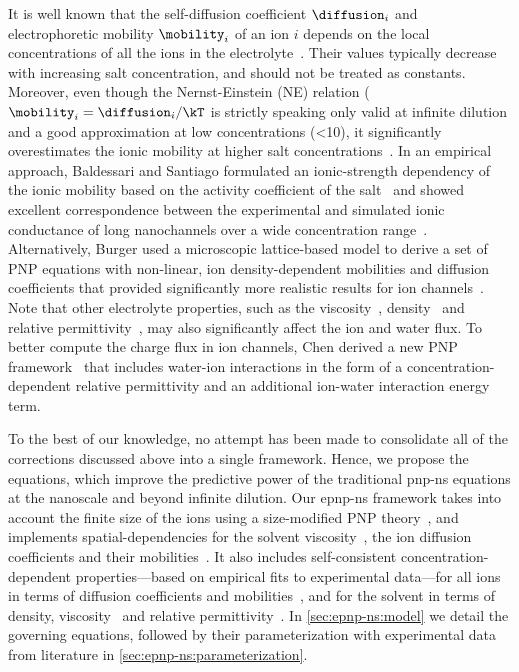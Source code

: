 It is well known that the self-diffusion coefficient $\diffusion_{i}$ and electrophoretic mobility
$\mobility_{i}$ of an ion $i$ depends on the local concentrations of all the ions in the
electrolyte~\cite{ContrerasAburto-2013-1}. Their values typically decrease with increasing salt concentration,
and should not be treated as constants. Moreover, even though the Nernst-Einstein (NE) relation
($\mobility_{i}=\diffusion_{i}/\kT$ is strictly speaking only valid at infinite dilution and a good
approximation at low concentrations (\SI{<10}{\mM}), it significantly overestimates the ionic mobility at
higher salt concentrations~\cite{Mills-1989,Panopoulos-1986,ContrerasAburto-2013-1,ContrerasAburto-2013-2}. In
an empirical approach, Baldessari and Santiago formulated an ionic-strength dependency of the ionic mobility
based on the activity coefficient of the salt~\cite{Baldessari-2008-1} and showed excellent correspondence
between the experimental and simulated ionic conductance of long nanochannels over a wide concentration
range~\cite{Baldessari-2008-2}. Alternatively, Burger \etal{} used a microscopic lattice-based model to derive
a set of PNP equations with non-linear, ion density-dependent mobilities and diffusion coefficients that
provided significantly more realistic results for ion channels~\cite{Burger-2012}. Note that other electrolyte
properties, such as the viscosity~\cite{Hai-Lang-1996}, density~\cite{Hai-Lang-1996} and relative
permittivity~\cite{Gavish-2016}, may also significantly affect the ion and water flux. To better compute the
charge flux in ion channels, Chen derived a new PNP framework~\cite{Chen-2016} that includes water-ion
interactions in the form of a concentration-dependent relative permittivity and an additional ion-water
interaction energy term.

To the best of our knowledge, no attempt has been made to consolidate all of the corrections discussed above
into a single framework. Hence, we propose the  equations, which improve the predictive
power of the traditional \gls{pnp-ns} equations at the nanoscale and beyond infinite dilution. Our
\gls{epnp-ns} framework takes into account the finite size of the ions using a size-modified PNP
theory~\cite{Borukhov-1997,Lu-2011}, and implements spatial-dependencies for the solvent
viscosity~\cite{Pronk-2014,Vo-2016,Hsu-2017}, the ion diffusion coefficients and their
mobilities~\cite{Makarov-1998,Noskov-2004,Pederson-2015}. It also includes self-consistent
concentration-dependent properties---based on empirical fits to experimental data---for all ions in terms of
diffusion coefficients and mobilities~\cite{Baldessari-2008-1,Mills-1989}, and for the solvent in terms of
density, viscosity~\cite{Hai-Lang-1996} and relative permittivity~\cite{Gavish-2016}. In
\cref{sec:epnp-ns:model} we detail the governing equations, followed by their parameterization with
experimental data from literature in \cref{sec:epnp-ns:parameterization}.


